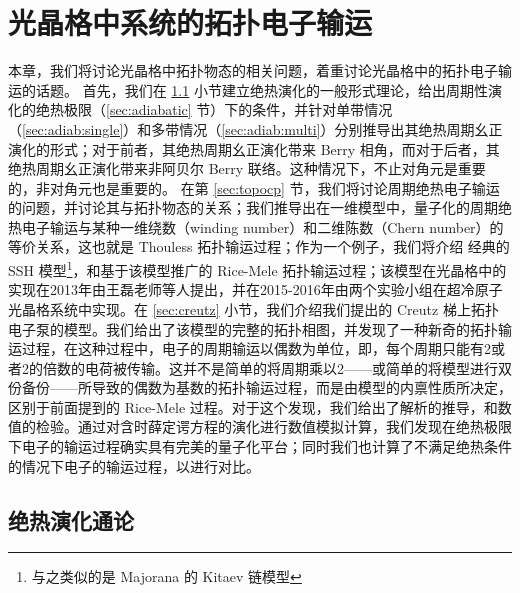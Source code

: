 \chapter{光晶格中系统的拓扑电子输运} \label{chap:chargepump}

本章，我们将讨论光晶格中拓扑物态的相关问题，着重讨论光晶格中的拓扑电子输运的话题。
首先，我们在 \ref{sec:adiabevolgeneral} 小节建立绝热演化的一般形式理论，给出周期性演化的绝热极限（\ref{sec:adiabatic} 节）下的条件，并针对单带情况（\ref{sec:adiab:single}）和多带情况（\ref{sec:adiab:multi}）分别推导出其绝热周期幺正演化的形式；对于前者，其绝热周期幺正演化带来 Berry 相角，而对于后者，其绝热周期幺正演化带来非阿贝尔 Berry 联络。这种情况下，不止对角元是重要的，非对角元也是重要的。
在第 \ref{sec:topocp} 节，我们将讨论周期绝热电子输运的问题，并讨论其与拓扑物态的关系；我们推导出在一维模型中，量子化的周期绝热电子输运与某种一维绕数（winding number）和二维陈数（Chern number）的等价关系，这也就是 Thouless 拓扑输运过程\cite{thouless1983}；作为一个例子，我们将介绍 经典的 SSH 模型\cite{ssh1979}\footnote{与之类似的是 Majorana 的 Kitaev 链模型\cite{kitaev2001}}，和基于该模型推广的 Rice-Mele 拓扑输运过程\cite{ricemele1982}；该模型在光晶格中的实现在2013年由王磊老师等人提出，并在2015-2016年由两个实验小组在超冷原子光晶格系统中实现。在 \ref{sec:creutz} 小节，我们介绍我们提出的 Creutz 梯\cite{creutz1999}上拓扑电子泵的模型\cite{creutz}。我们给出了该模型的完整的拓扑相图，并发现了一种新奇的拓扑输运过程，在这种过程中，电子的周期输运以偶数为单位，即，每个周期只能有2或者2的倍数的电荷被传输。这并不是简单的将周期乘以2——或简单的将模型进行双份备份——所导致的偶数为基数的拓扑输运过程，而是由模型的内禀性质所决定，区别于前面提到的 Rice-Mele 过程。对于这个发现，我们给出了解析的推导，和数值的检验。通过对含时薛定谔方程的演化进行数值模拟计算，我们发现在绝热极限下电子的输运过程确实具有完美的量子化平台；同时我们也计算了不满足绝热条件的情况下电子的输运过程，以进行对比。





\section{绝热演化通论}\label{sec:adiabevolgeneral}

